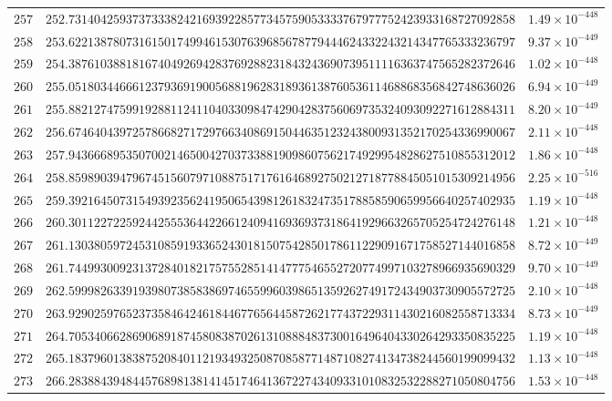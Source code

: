\documentclass[12pt,reqno]{amsart}
\theoremstyle{remark}
\begin{document}
\begin{longtable}{clc}
$257$ & $252.7314042593737333824216939228577345759053333767977752423933168727092858$ & $1.49\times 10^{-448}$ \\
$258$ & $253.6221387807316150174994615307639685678779444624332243214347765333236797$ & $9.37\times 10^{-449}$ \\
$259$ & $254.3876103881816740492694283769288231843243690739511116363747565282372646$ & $1.02\times 10^{-448}$ \\
$260$ & $255.0518034466612379369190056881962831893613876053611468868356842748636026$ & $6.94\times 10^{-449}$ \\
$261$ & $255.8821274759919288112411040330984742904283756069735324093092271612884311$ & $8.20\times 10^{-449}$ \\
$262$ & $256.6746404397257866827172976634086915044635123243800931352170254336990067$ & $2.11\times 10^{-448}$ \\
$263$ & $257.9436668953507002146500427037338819098607562174929954828627510855312012$ & $1.86\times 10^{-448}$ \\
$264$ & $258.8598903947967451560797108875171761646892750212718778845051015309214956$ & $2.25\times 10^{-516}$ \\
$265$ & $259.3921645073154939235624195065439812618324735178858590659956640257402935$ & $1.19\times 10^{-448}$ \\
$266$ & $260.3011227225924425553644226612409416936937318641929663265705254724276148$ & $1.21\times 10^{-448}$ \\
$267$ & $261.1303805972453108591933652430181507542850178611229091671758527144016858$ & $8.72\times 10^{-449}$ \\
$268$ & $261.7449930092313728401821757552851414777546552720774997103278966935690329$ & $9.70\times 10^{-449}$ \\
$269$ & $262.5999826339193980738583869746559960398651359262749172434903730905572725$ & $2.10\times 10^{-448}$ \\
$270$ & $263.9290259765237358464246184467765644587262177437229311430216082558713334$ & $8.73\times 10^{-449}$ \\
$271$ & $264.7053406628690689187458083870261310888483730016496404330264293350835225$ & $1.19\times 10^{-448}$ \\
$272$ & $265.1837960138387520840112193493250870858771487108274134738244560199099432$ & $1.13\times 10^{-448}$ \\
$273$ & $266.2838843948445768981381414517464136722743409331010832532288271050804756$ & $1.53\times 10^{-448}$ \\

\end{longtable}
\end{document}
